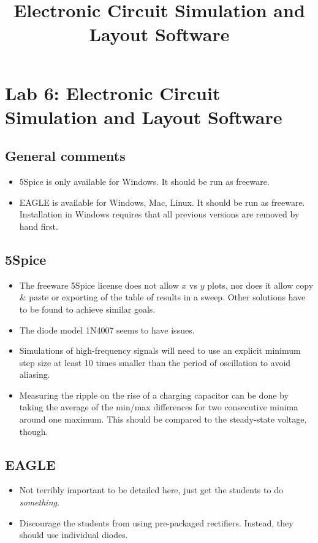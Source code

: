 \documentclass{article}
\title{Electronic Circuit Simulation and Layout Software}
\begin{document}
\maketitle

\section{Lab 6: Electronic Circuit Simulation and Layout Software}

\subsection*{General comments}

\begin{itemize}
\item 5Spice is only available for Windows.  It should be run as freeware.
\item EAGLE is available for Windows, Mac, Linux.  It should be run as freeware.  Installation in Windows requires that all previous versions are removed by hand first.
\end{itemize}

\subsection{5Spice}
\begin{itemize}
\item The freeware 5Spice license does not allow $x$ vs $y$ plots, nor does it allow copy \& paste or exporting of the table of results in a sweep.  Other solutions have to be found to achieve similar goals.
\item The diode model 1N4007 seems to have issues.
\item Simulations of high-frequency signals will need to use an explicit minimum step size at least 10 times smaller than the period of oscillation to avoid aliasing.
\item Measuring the ripple on the rise of a charging capacitor can be done by taking the average of the min/max differences for two consecutive minima around one maximum.  This should be compared to the steady-state voltage, though.
\end{itemize}

\subsection{EAGLE}
\begin{itemize}
\item Not terribly important to be detailed here, just get the students to do \emph{something}.
\item Discourage the students from using pre-packaged rectifiers.  Instead, they should use individual diodes.
\end{itemize}
\end{document}
